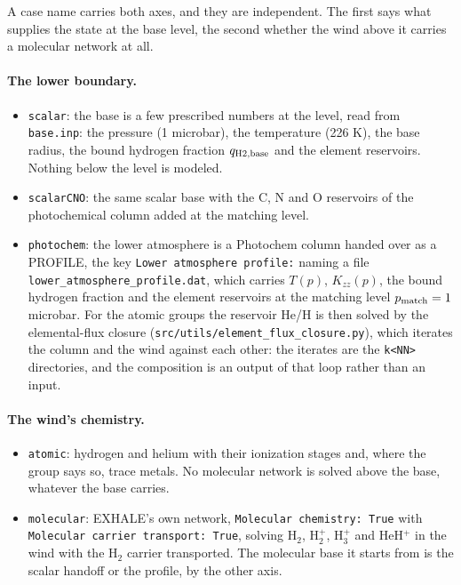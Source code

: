 \documentclass[11pt]{my_memo}
\begin{document}
A case name carries both axes, and they are independent. The first says what
supplies the state at the base level, the second whether the wind above it
carries a molecular network at all.

\paragraph{The lower boundary.}
\begin{itemize}
\item \texttt{scalar}: the base is a few prescribed numbers at the level,
      read from \texttt{base.inp}: the pressure (1 microbar), the temperature
      (226 K), the base radius, the bound hydrogen fraction $q_{\rm H2,base}$
      and the element reservoirs. Nothing below the level is modeled.
\item \texttt{scalarCNO}: the same scalar base with the C, N and O reservoirs
      of the photochemical column added at the matching level.
\item \texttt{photochem}: the lower atmosphere is a Photochem column handed
      over as a PROFILE, the key \texttt{Lower atmosphere profile:} naming a
      file \texttt{lower\_atmosphere\_profile.dat}, which carries $T(p)$, $K_{zz}(p)$, the
      bound hydrogen fraction and the element reservoirs at the matching
      level $p_{\rm match} = 1$ microbar. For the atomic groups the reservoir
      He/H is then solved by the elemental-flux closure
      (\texttt{src/utils/element\_flux\_closure.py}), which iterates the
      column and the wind against each other: the iterates are the
      \texttt{k<NN>} directories, and the composition is an output of that
      loop rather than an input.
\end{itemize}

\paragraph{The wind's chemistry.}
\begin{itemize}
\item \texttt{atomic}: hydrogen and helium with their ionization stages and,
      where the group says so, trace metals. No molecular network is solved
      above the base, whatever the base carries.
\item \texttt{molecular}: EXHALE's own network, \texttt{Molecular chemistry:
      True} with \texttt{Molecular carrier transport: True}, solving H$_2$,
      H$_2^+$, H$_3^+$ and HeH$^+$ in the wind with the H$_2$ carrier
      transported. The molecular base it starts from is the scalar handoff or
      the profile, by the other axis.
\end{itemize}
\end{document}
